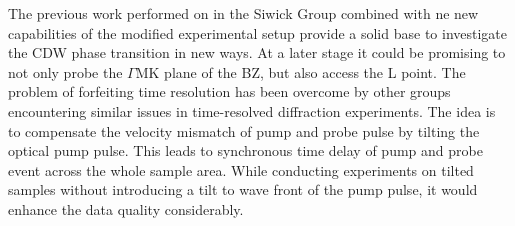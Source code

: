 The previous work performed on \ts\space in the Siwick Group combined with ne new capabilities of the modified experimental setup provide a solid base to investigate the \ac{CDW} phase transition in new ways.
At a later stage it could be promising to not only probe the $\Gamma\mathrm{MK}$ plane of the \ac{BZ}, but also access the L point.
The problem of forfeiting time resolution has been overcome by other groups encountering similar issues in time-resolved diffraction experiments.
The idea is to compensate the velocity mismatch of pump and probe pulse by tilting the optical pump pulse.
This leads to synchronous time delay of pump and probe event across the whole sample area\cite{baum2006,zhou2013}.
While conducting experiments on tilted samples without introducing a tilt to wave front of the pump pulse, it would enhance the data quality considerably.

